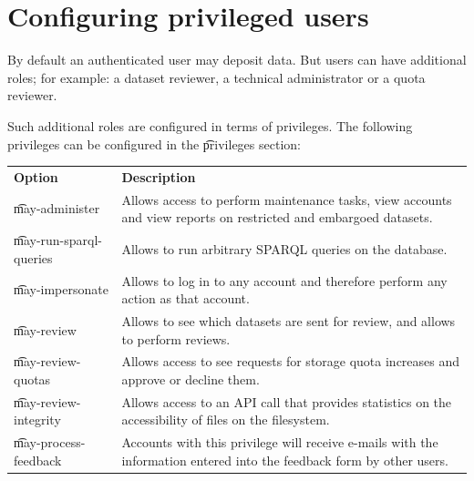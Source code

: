 \section{Configuring privileged users}

  By default an authenticated user may deposit data. But users can have
  additional roles; for example: a dataset reviewer, a technical
  administrator or a quota reviewer.

  Such additional roles are configured in terms of privileges.  The
  following privileges can be configured in the \t{privileges} section:

\begin{tabularx}{\textwidth}{*{1}{!{\VRule[-1pt]}l}!{\VRule[-1pt]}X}
  \headrow
  \textbf{Option}                     & \textbf{Description}\\
  \t{may-administer}                  & Allows access to perform maintenance
                                        tasks, view accounts and view reports
                                        on restricted and embargoed datasets.\\
  \t{may-run-sparql-queries}          & Allows to run arbitrary SPARQL queries
                                        on the database.\\
  \t{may-impersonate}                 & Allows to log in to any account and
                                        therefore perform any action as that
                                        account.\\
  \t{may-review}                      & Allows to see which datasets are sent
                                        for review, and allows to perform
                                        reviews.\\
  \t{may-review-quotas}               & Allows access to see requests for
                                        storage quota increases and approve or
                                        decline them.\\
  \t{may-review-integrity}            & Allows access to an API call that
                                        provides statistics on the accessibility
                                        of files on the filesystem.\\
  \t{may-process-feedback}            & Accounts with this privilege will
                                        receive e-mails with the information
                                        entered into the feedback form by other
                                        users.\\

\end{tabularx}
